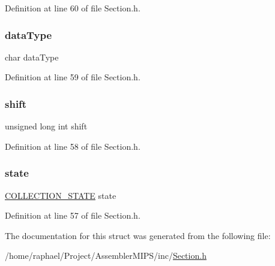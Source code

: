 Definition at line 60 of file Section.\+h.

\mbox{\label{struct_s_e_c_t_i_o_n_a03166a9dfad889de78a15a51d04851b5}} 
\subsubsection{\texorpdfstring{data\+Type}{dataType}}
{\footnotesize\ttfamily char data\+Type}



Definition at line 59 of file Section.\+h.

\mbox{\label{struct_s_e_c_t_i_o_n_a2eb484bf0333898743ffbcc21e2ee118}} 
\subsubsection{\texorpdfstring{shift}{shift}}
{\footnotesize\ttfamily unsigned long int shift}



Definition at line 58 of file Section.\+h.

\mbox{\label{struct_s_e_c_t_i_o_n_a08d4030412839135534c1446ea4b22ea}} 
\subsubsection{\texorpdfstring{state}{state}}
{\footnotesize\ttfamily \mbox{\hyperlink{_f_s_m_collection_8h_a1ffa02d402e882e4716ee5d2884de8a8}{C\+O\+L\+L\+E\+C\+T\+I\+O\+N\+\_\+\+S\+T\+A\+TE}} state}



Definition at line 57 of file Section.\+h.



The documentation for this struct was generated from the following file\+:\begin{DoxyCompactItemize}
\item 
/home/raphael/\+Project/\+Assembler\+M\+I\+P\+S/inc/\mbox{\hyperlink{_section_8h}{Section.\+h}}\end{DoxyCompactItemize}
